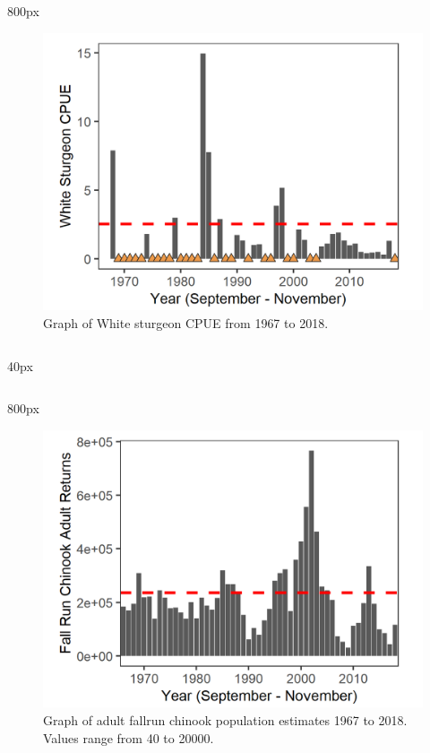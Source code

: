\documentclass[
]{book}
\begin{document}
\begin{column}{800px\textwidth}
\begin{figure}
\includegraphics[width=15.25in]{figures/WST_1966} \caption{Graph of White sturgeon CPUE from 1967 to 2018. }\label{fig:unnamed-chunk-131}
\end{figure}
\end{column}

\begin{column}{40px\textwidth}
~
\end{column}

\begin{column}{800px\textwidth}
\begin{figure}
\includegraphics[width=15.25in]{figures/FallRun_1966} \caption{Graph of adult fallrun chinook population estimates 1967 to 2018. Values range from 40 to 20000.}\label{fig:unnamed-chunk-132}
\end{figure}
\end{column}
\end{document}
